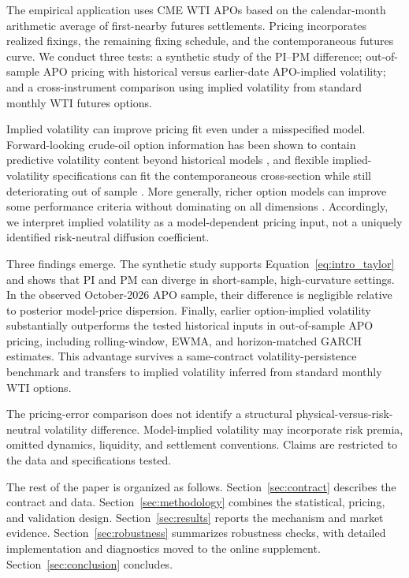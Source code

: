 The empirical application uses CME WTI APOs based on the calendar-month arithmetic average of first-nearby futures settlements. Pricing incorporates realized fixings, the remaining fixing schedule, and the contemporaneous futures curve. We conduct three tests: a synthetic study of the PI--PM difference; out-of-sample APO pricing with historical versus earlier-date APO-implied volatility; and a cross-instrument comparison using implied volatility from standard monthly WTI futures options.

Implied volatility can improve pricing fit even under a misspecified model. Forward-looking crude-oil option information has been shown to contain predictive volatility content beyond historical models \cite{gildertsiaras2020}, and flexible implied-volatility specifications can fit the contemporaneous cross-section while still deteriorating out of sample \cite{dumasflemingwhaley1998}. More generally, richer option models can improve some performance criteria without dominating on all dimensions \cite{bakshicaochen1997,cumminsesposito2025}. Accordingly, we interpret implied volatility as a model-dependent pricing input, not a uniquely identified risk-neutral diffusion coefficient.

Three findings emerge. The synthetic study supports Equation~\eqref{eq:intro_taylor} and shows that PI and PM can diverge in short-sample, high-curvature settings. In the observed October-2026 APO sample, their difference is negligible relative to posterior model-price dispersion. Finally, earlier option-implied volatility substantially outperforms the tested historical inputs in out-of-sample APO pricing, including rolling-window, EWMA, and horizon-matched GARCH estimates. This advantage survives a same-contract volatility-persistence benchmark and transfers to implied volatility inferred from standard monthly WTI options.

The pricing-error comparison does not identify a structural physical-versus-risk-neutral volatility difference. Model-implied volatility may incorporate risk premia, omitted dynamics, liquidity, and settlement conventions. Claims are restricted to the data and specifications tested.

The rest of the paper is organized as follows. Section~\ref{sec:contract} describes the contract and data. Section~\ref{sec:methodology} combines the statistical, pricing, and validation design. Section~\ref{sec:results} reports the mechanism and market evidence. Section~\ref{sec:robustness} summarizes robustness checks, with detailed implementation and diagnostics moved to the online supplement. Section~\ref{sec:conclusion} concludes.
